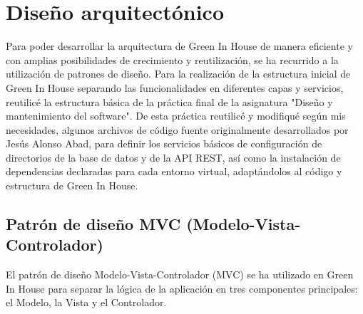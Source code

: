   



\section{Diseño arquitectónico}
Para poder desarrollar la arquitectura de Green In House de manera eficiente y con amplias posibilidades de crecimiento y reutilización, se ha recurrido a la utilización de patrones de diseño. Para la realización de la estructura inicial de Green In House separando las funcionalidades en diferentes capas y servicios, reutilicé la estructura básica de la práctica final de la asignatura "Diseño y mantenimiento del software". De esta práctica reutilicé y modifiqué según mis necesidades, algunos archivos de código fuente originalmente desarrollados por Jesús Alonso Abad, para definir los servicios básicos de configuración de directorios de la base de datos y de la API REST, así como la instalación de dependencias declaradas para cada entorno virtual, adaptándolos al código y estructura de Green In House.

    \subsection{Patrón de diseño MVC (Modelo-Vista-Controlador)}
    El patrón de diseño Modelo-Vista-Controlador (MVC) se ha utilizado en Green In House para separar la lógica de la aplicación en tres componentes principales: el Modelo, la Vista y el Controlador. 
